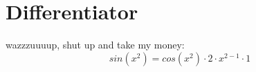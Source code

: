 \documentclass{article}
\begin{document}
\section{Differentiator}
wazzzuuuup, shut up and take my money:$$ sin  {(  {  x  }  ^  {  2  }  )}  =  { cos  {(  {  x  }  ^  {  2  }  )}  }  \cdot  {  {  {  2  }  \cdot  {  {  x  }  ^  {  {  2  }  -  {  1  }  }  }  }  \cdot  {  1  }  }  $$
\end{document}

